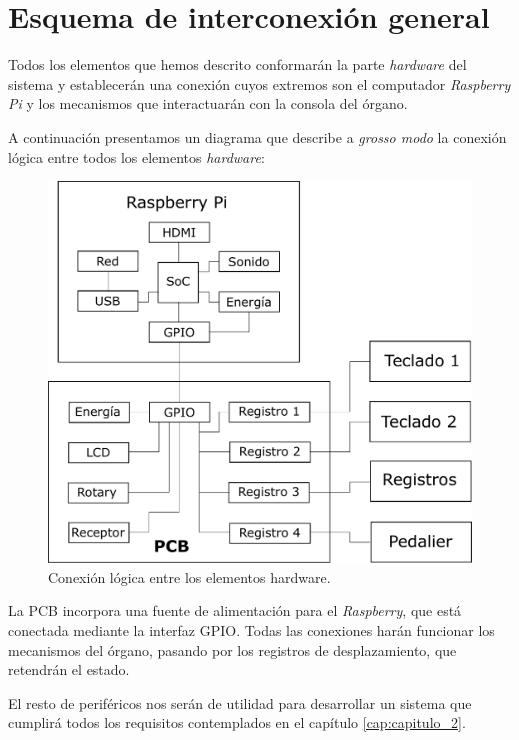 \section{Esquema de interconexión general}

Todos los elementos que hemos descrito conformarán la parte \textit{hardware} del sistema y establecerán una conexión cuyos extremos son el computador \textit{Raspberry Pi} y los mecanismos que interactuarán con la consola del órgano.

A continuación presentamos un diagrama que describe a \textit{grosso modo} la conexión lógica entre todos los elementos \textit{hardware}:

\smallskip

\begin{figure}[H]
	\noindent \begin{centering}
		\includegraphics[width=\linewidth*2/3]{capitulo3/hardware}
		\par\end{centering}
	\smallskip
	\caption{\label{fig:hardware} Conexión lógica entre los elementos hardware.}
\end{figure} 

\smallskip

La \acrshort{PCB} incorpora una fuente de alimentación para el \textit{Raspberry}, que está conectada mediante la interfaz \acrshort{GPIO}. Todas las conexiones harán funcionar los mecanismos del órgano, pasando por los registros de desplazamiento, que retendrán el estado.

El resto de periféricos nos serán de utilidad para desarrollar un sistema que cumplirá todos los requisitos contemplados en el capítulo \ref{cap:capitulo_2}.

\clearpage{\cleardoublepage}
\clearpage{\pagestyle{empty}\cleardoublepage}